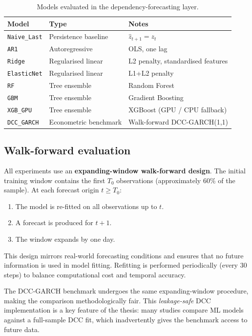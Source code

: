 \documentclass[12pt, a4paper]{article}
\begin{document}
\begin{table}[H]
  \centering
  \caption{Models evaluated in the dependency-forecasting layer.}
  \label{tab:models}
  \begin{tabular}{lll}
    \toprule
    Model              & Type                     & Notes \\
    \midrule
    \texttt{Naive\_Last}  & Persistence baseline  & $\hat{z}_{t+1} = z_t$ \\
    \texttt{AR1}          & Autoregressive        & OLS, one lag \\
    \texttt{Ridge}        & Regularised linear    & L2 penalty, standardised features \\
    \texttt{ElasticNet}   & Regularised linear    & L1+L2 penalty \\
    \texttt{RF}           & Tree ensemble         & Random Forest \\
    \texttt{GBM}          & Tree ensemble         & Gradient Boosting \\
    \texttt{XGB\_GPU}     & Tree ensemble         & XGBoost (GPU / CPU fallback) \\
    \texttt{DCC\_GARCH}   & Econometric benchmark & Walk-forward DCC-GARCH(1,1) \\
    \bottomrule
  \end{tabular}
\end{table}

\subsection{Walk-forward evaluation}

All experiments use an \textbf{expanding-window walk-forward design}.
The initial training window contains the first $T_0$ observations
(approximately 60\% of the sample).
At each forecast origin $t \geq T_0$:
\begin{enumerate}[noitemsep]
  \item The model is re-fitted on all observations up to $t$.
  \item A forecast is produced for $t+1$.
  \item The window expands by one day.
\end{enumerate}

This design mirrors real-world forecasting conditions and
ensures that no future information is used in model fitting.
Refitting is performed periodically (every 30 steps) to
balance computational cost and temporal accuracy.

The DCC-GARCH benchmark undergoes the same expanding-window
procedure, making the comparison methodologically fair.
This \emph{leakage-safe} DCC implementation is a key
feature of the thesis: many studies compare ML models
against a full-sample DCC fit, which inadvertently gives
the benchmark access to future data.
\end{document}
